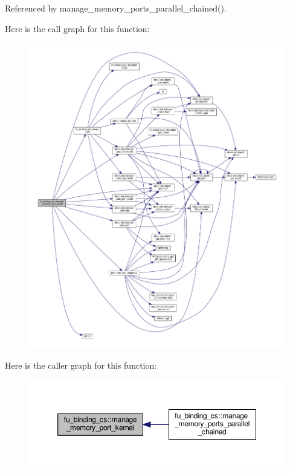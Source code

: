 Referenced by manage\+\_\+memory\+\_\+ports\+\_\+parallel\+\_\+chained().

Here is the call graph for this function\+:
\nopagebreak
\begin{figure}[H]
\begin{center}
\leavevmode
\includegraphics[width=350pt]{d4/d7b/classfu__binding__cs_a96110f5b42db5729356de61f5824bdce_cgraph}
\end{center}
\end{figure}
Here is the caller graph for this function\+:
\nopagebreak
\begin{figure}[H]
\begin{center}
\leavevmode
\includegraphics[width=350pt]{d4/d7b/classfu__binding__cs_a96110f5b42db5729356de61f5824bdce_icgraph}
\end{center}
\end{figure}
\mbox{\label{classfu__binding__cs_a11b4e8a8b74e18bf3c73c2c535471270}} 
